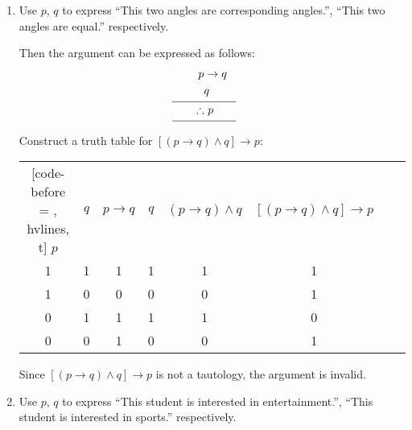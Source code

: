 \documentclass{report}
\begin{document}
\begin{solution}
    \item \begin{enumerate}[label=(\alph*), leftmargin=*]
        \item Use $p$, $q$ to express ``This two angles are corresponding angles.'', ``This
              two angles are equal.'' respectively.

              Then the argument can be expressed as follows:
              \begin{align*}
                  p          & \rightarrow q                \\
                             & q                            \\[-8pt]
                             & \mathclap{\rule{2cm}{0.4pt}} \\[-5pt]
                  \therefore & \ p                          \\[-8pt]
                             & \mathclap{\rule{2cm}{0.4pt}}
              \end{align*}
              Construct a truth table for $[(p \rightarrow q) \land q] \rightarrow p$:
              \begin{center}
                  \begin{NiceTabular}{|c|c|c|c|c|c|c|c|}[code-before = , hvlines, t]
                      $p$ & $q$ & $p \rightarrow q$ & $q$ & $(p \rightarrow q) \land q$ & $[(p \rightarrow q) \land q] \rightarrow p$ \\
                      1   & 1   & 1                 & 1   & 1                           & 1                                           \\
                      1   & 0   & 0                 & 0   & 0                           & 1                                           \\
                      0   & 1   & 1                 & 1   & 1                           & 0                                           \\
                      0   & 0   & 1                 & 0   & 0                           & 1                                           \\
                  \end{NiceTabular}
              \end{center}
              Since $[(p \rightarrow q) \land q] \rightarrow p$ is not a tautology, the argument is invalid.

        \item Use $p$, $q$ to express ``This student is interested in entertainment.'',
              ``This student is interested in sports.'' respectively.


\end{enumerate}
\end{solution}
\end{document}
